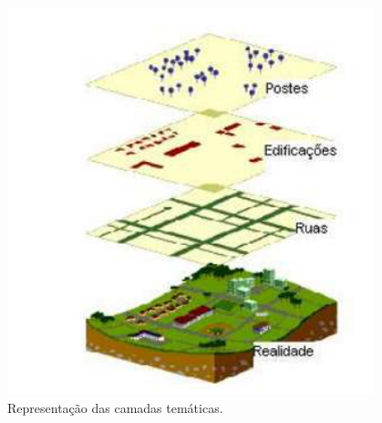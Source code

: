 \documentclass[
	12pt,				%
    oneside,			%
	a4paper,			%
	english,			%
	french,				%
	spanish,			%
	brazil,				%
	]{abntex2}
\begin{document}
\begin{figure} [hbt] 
\label{figura1} 
\caption{Representação das camadas temáticas.}
\includegraphics[width=0.95\textwidth]{camada.png} %
\end{figure}


\end{document}
